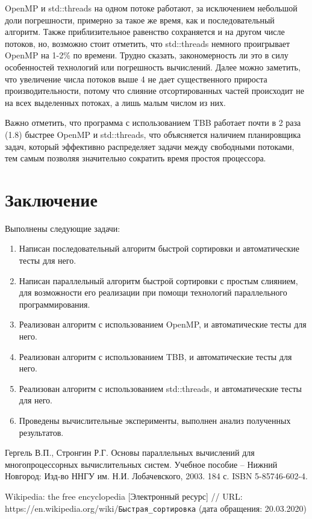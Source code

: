 \documentclass{report}
\begin{document}
\par OpenMP и std::threads на одном потоке работают, за исключением небольшой доли погрешности, примерно за такое же время, как и последовательный алгоритм. Также приблизительное равенство сохраняется и на другом числе потоков, но, возможно стоит отметить, что std::threads немного проигрывает OpenMP на 1-2\% по времени. Трудно сказать, закономерность ли это в силу особенностей технологий или погрешность вычислений. Далее можно заметить, что увеличение числа потоков выше 4 не дает существенного прироста производительности, потому что слияние отсортированных частей происходит не на всех выделенных потоках, а лишь малым числом из них. 
\par Важно отметить, что программа с использованием TBB работает почти в 2 раза (1.8) 
быстрее OpenMP и std::threads, что объясняется наличием планировщика задач, который эффективно распределяет задачи между свободными потоками, тем самым позволяя значительно сократить время простоя процессора.  
 
\newpage

\section*{Заключение}

Выполнены следующие задачи:

\begin{enumerate} 
\item Написан последовательный алгоритм быстрой сортировки и автоматические тесты для него.
\item Написан параллельный алгоритм быстрой сортировки с простым слиянием, для возможности его реализации при помощи технологий параллельного программирования.
\item Реализован алгоритм с  использованием OpenMP, и автоматические тесты для него.
\item Реализован алгоритм с  использованием TBB, и автоматические тесты для него.
\item Реализован алгоритм с  использованием std::threads, и автоматические тесты для него.
\item Проведены вычислительные эксперименты, выполнен анализ полученных результатов. 
\end{enumerate} 

\newpage

\begin{thebibliography}{1}

 Гергель В.П., Стронгин Р.Г. Основы параллельных вычислений для многопроцессорных вычислительных систем. Учебное пособие – Нижний Новгород: Изд-во ННГУ им. Н.И. Лобачевского, 2003. 184 с. ISBN 5-85746-602-4. 

 Wikipedia: the free encyclopedia [Электронный ресурс] // URL: https://en.wikipedia.org/wiki/\verb|Быстрая_сортировка| (дата обращения: 20.03.2020)

\end{thebibliography}
\newpage
\end{document}
